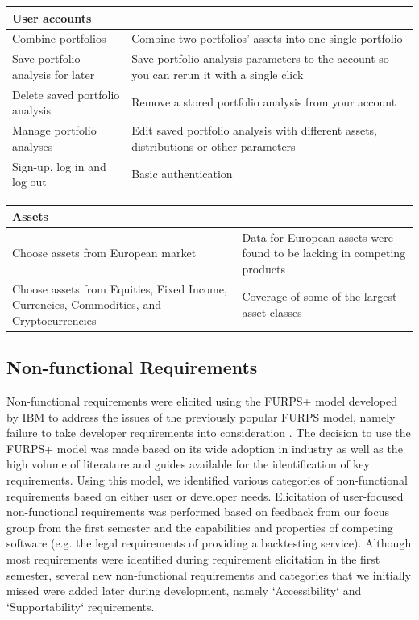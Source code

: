 \documentclass[main.tex]{subfiles}
\begin{document}
{
\setlength{\tabcolsep}{30pt}
\renewcommand{\arraystretch}{2}
\centering
{}
\begin{tabularx}{\linewidth}{|X|X|}
\hline
 \textbf{User accounts}  &  \\
 \hline
 Combine portfolios & Combine two portfolios' assets into one single portfolio \\
\hline
Save portfolio analysis for later & Save portfolio analysis parameters to the account so you can rerun it with a single click \\
\hline
Delete saved portfolio analysis & Remove a stored portfolio analysis from your account \\
\hline
Manage portfolio analyses & Edit saved portfolio analysis with different assets, distributions or other parameters \\
\hline
Sign-up, log in and log out & Basic authentication \\
\hline
\end{tabularx}
}

\vspace{0.5cm}

{
\setlength{\tabcolsep}{30pt}
\renewcommand{\arraystretch}{2}
\centering
{}
\begin{tabularx}{\linewidth}{|X|X|}
\hline
 \textbf{Assets}  &  \\
 \hline
 Choose assets from European market & Data for European assets were found to be lacking in competing products \\
\hline
Choose assets from Equities, Fixed Income, Currencies, Commodities, and Cryptocurrencies & Coverage of some of the largest asset classes \\
\hline
\end{tabularx}
}

\subsection{Non-functional Requirements}
Non-functional requirements were elicited using the FURPS+ model developed by IBM to address the issues of the previously popular FURPS model, namely failure to take developer requirements into consideration \cite{FURPS_drawbacks}. The decision to use the FURPS+ model was made based on its wide adoption in industry as well as the high volume of literature and guides available for the identification of key requirements. Using this model, we identified various categories of non-functional requirements based on either user or developer needs. Elicitation of user-focused non-functional requirements was performed based on feedback from our focus group from the first semester and the capabilities and properties of competing software (e.g. the legal requirements of providing a backtesting service). Although most requirements were identified during requirement elicitation in the first semester, several new non-functional requirements and categories that we initially missed were added later during development, namely `Accessibility` and `Supportability` requirements.
\end{document}
